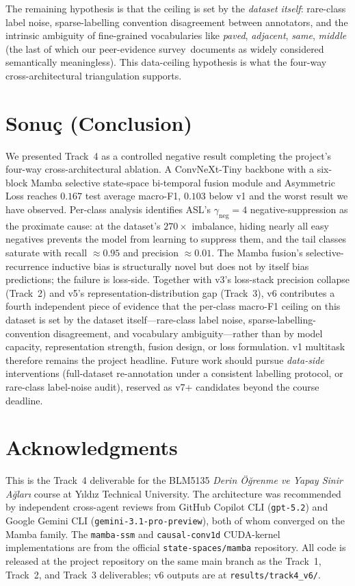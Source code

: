 \documentclass[journal]{IEEEtran}
\begin{document}
The remaining hypothesis is that the ceiling is set by the \emph{dataset itself}: rare-class label noise, sparse-labelling convention disagreement between annotators, and the intrinsic ambiguity of fine-grained vocabularies like \emph{paved}, \emph{adjacent}, \emph{same}, \emph{middle} (the last of which our peer-evidence survey~documents as widely considered semantically meaningless). This data-ceiling hypothesis is what the four-way cross-architectural triangulation supports.

\section{Sonu\c{c} (Conclusion)}\label{sec:sonuc}
We presented Track~4 as a controlled negative result completing the project's four-way cross-architectural ablation. A ConvNeXt-Tiny backbone with a six-block Mamba selective state-space bi-temporal fusion module and Asymmetric Loss reaches $0.167$ test average macro-F1, $0.103$ below v1 and the worst result we have observed. Per-class analysis identifies ASL's $\gamma_\mathrm{neg}{=}4$ negative-suppression as the proximate cause: at the dataset's $270{\times}$ imbalance, hiding nearly all easy negatives prevents the model from learning to suppress them, and the tail classes saturate with recall $\approx 0.95$ and precision $\approx 0.01$. The Mamba fusion's selective-recurrence inductive bias is structurally novel but does not by itself bias predictions; the failure is loss-side. Together with v3's loss-stack precision collapse (Track~2) and v5's representation-distribution gap (Track~3), v6 contributes a fourth independent piece of evidence that the per-class macro-F1 ceiling on this dataset is set by the dataset itself---rare-class label noise, sparse-labelling-convention disagreement, and vocabulary ambiguity---rather than by model capacity, representation strength, fusion design, or loss formulation. v1 multitask therefore remains the project headline. Future work should pursue \emph{data-side} interventions (full-dataset re-annotation under a consistent labelling protocol, or rare-class label-noise audit), reserved as v7+ candidates beyond the course deadline.

\section*{Acknowledgments}
This is the Track~4 deliverable for the BLM5135 \emph{Derin \"O\u{g}renme ve Yapay Sinir A\u{g}lar\i} course at Y\i ld\i z Technical University. The architecture was recommended by independent cross-agent reviews from GitHub Copilot CLI (\texttt{gpt-5.2}) and Google Gemini CLI (\texttt{gemini-3.1-pro-preview}), both of whom converged on the Mamba family. The \texttt{mamba-ssm} and \texttt{causal-conv1d} CUDA-kernel implementations are from the official \texttt{state-spaces/mamba} repository. All code is released at the project repository on the same main branch as the Track~1, Track~2, and Track~3 deliverables; v6 outputs are at \texttt{results/track4\_v6/}.



\end{document}
